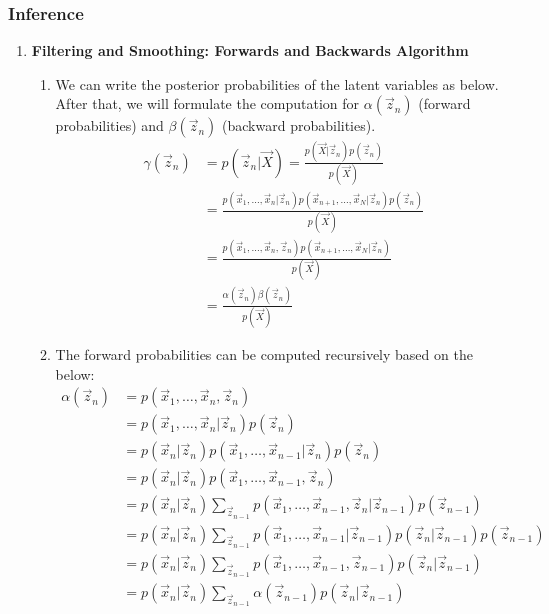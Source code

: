 \documentclass[12pt,twoside]{article}
\begin{document}
\subsubsection{Inference}
\begin{enumerate}
\item \textbf{Filtering and Smoothing: Forwards and Backwards Algorithm}

	\begin{enumerate}

	\item We can write the posterior probabilities of the latent variables as below. After that, we will formulate the computation for $\alpha(\vec{z}_n)$ (forward probabilities) and $		\beta(\vec{z}_n)$ (backward probabilities).
		\begin{align*}
			\gamma(\vec{z}_n) & = p(\vec{z}_n\vert \vec{X}) = \frac{p(\vec{X}\vert \vec{z}_n)p(\vec{z}_n)}{p(\vec{X})}\\
			& = \frac{p(\vec{x}_1,\ldots, \vec{x}_n \vert \vec{z}_n)p(\vec{x}_{n+1},\ldots,\vec{x}_N\vert \vec{z}_n)p(\vec{z}_n)}{p(\vec{X})}\\
			& = \frac{p(\vec{x}_1,\ldots, \vec{x}_n, \vec{z}_n)p(\vec{x}_{n+1},\ldots,\vec{x}_N\vert \vec{z}_n)}{p(\vec{X})}\\
			& = \frac{\alpha(\vec{z}_n)\beta(\vec{z}_n)}{p(\vec{X})}
		\end{align*}

	\item The forward probabilities can be computed recursively based on the below:
		\begin{align*}
			\alpha(\vec{z}_n)
			& = p(\vec{x}_1,\ldots, \vec{x}_n, \vec{z}_n)\\
			& = p(\vec{x}_1,\ldots, \vec{x}_n\vert \vec{z}_n) p(\vec{z}_n)\\
			& = p(\vec{x}_n\vert \vec{z}_n) p(\vec{x}_1,\ldots, \vec{x}_{n-1}\vert \vec{z}_n) p(\vec{z}_n)\\
			& = p(\vec{x}_n\vert \vec{z}_n) p(\vec{x}_1,\ldots, \vec{x}_{n-1}, \vec{z}_n)\\
			& = p(\vec{x}_n\vert \vec{z}_n) \sum_{\vec{z}_{n-1}}p(\vec{x}_1,\ldots, \vec{x}_{n-1}, \vec{z}_n \vert \vec{z}_{n-1})p(\vec{z}_{n-1})\\
			& = p(\vec{x}_n\vert \vec{z}_n) \sum_{\vec{z}_{n-1}}p(\vec{x}_1,\ldots, \vec{x}_{n-1}\vert \vec{z}_{n-1})p(\vec{z}_n\vert \vec{z}_{n-1}) p(\vec{z}_{n-1})\\
			& = p(\vec{x}_n\vert \vec{z}_n) \sum_{\vec{z}_{n-1}}p(\vec{x}_1,\ldots, \vec{x}_{n-1}, \vec{z}_{n-1})p(\vec{z}_n\vert \vec{z}_{n-1}) \\
			& = p(\vec{x}_n\vert \vec{z}_n) \sum_{\vec{z}_{n-1}} \alpha(\vec{z}_{n-1})p(\vec{z}_n\vert \vec{z}_{n-1})
		\end{align*}


\end{enumerate}
\end{enumerate}
\end{document}
